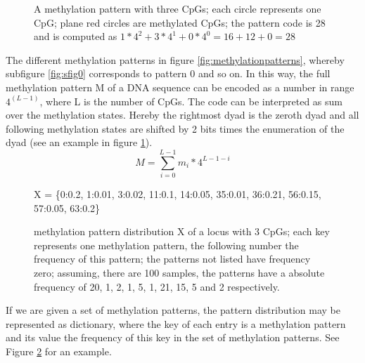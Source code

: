 \begin{figure}[h]
\centering
{}
\caption{A methylation pattern with three CpGs; each circle represents one CpG; plane red circles are methylated CpGs; the pattern code is 28 and is computed as $1*4^2 + 3*4^1 + 0*4^0 = 16 + 12 + 0 = 28$}
\label{fig:mexample}
\end{figure}

The different methylation patterns in figure \ref{fig:methylationpatterns}, whereby subfigure \ref{fig:sfig0} corresponds to pattern 0 and so on.\newline
In this way, the full methylation pattern M of a DNA sequence can be encoded as a number in range $4^(L-1)$, where L is the number of \acp{CpG}. The code can be interpreted as sum over the methylation states. Hereby the rightmost dyad is the zeroth dyad and all following methylation states are shifted by 2 bits times the enumeration of the dyad (see an example in figure \ref{fig:mexample}).
\[M = \sum^{L-1}_{i=0}{m_i * 4^{L-1-i}}\]
\begin{figure}
X = \{0:0.2, 1:0.01, 3:0.02, 11:0.1, 14:0.05, 35:0.01, 36:0.21, 56:0.15, 57:0.05, 63:0.2\}
\label{dict}
\caption{methylation pattern distribution X of a locus with 3 CpGs; each key represents one methylation pattern, the following number the frequency of this pattern; the patterns not listed have frequency zero; assuming, there are 100 samples, the patterns have a absolute frequency of 20, 1, 2, 1, 5, 1, 21, 15, 5 and 2 respectively.}
\end{figure}
If we are given a set of methylation patterns, the pattern distribution may be represented as dictionary, where the key of each entry is a methylation pattern and its value the frequency of this key in the set of methylation patterns. See Figure \ref{dict} for an example.\\

